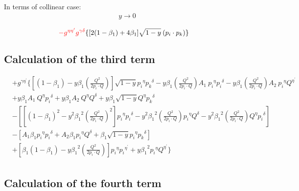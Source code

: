 In terms of collinear case:
\begin{equation}
\begin{split}
y\rightarrow 0
\end{split}
\end{equation}

\begin{equation}
\begin{split}
&{\color[RGB]{255,0,0} -g^{{{\eta}}{{\eta}^{\prime}}}g^{{{\gamma}}{{\delta}}}}\lbrace [2(1-\beta_1)+4\beta_1] \sqrt{1-y}\:({p_i}\cdot{p_k})\rbrace
\end{split}
\end{equation}


\subsection*{Calculation of the third term}
\begin{equation}
\begin{split} 
&+g^{{{\gamma}}{{\eta}^{\prime}}}\lbrace [(1-\beta_1)-y\beta_1 (\frac{Q^2}{2p_i \cdot Q})] \sqrt{1-y}{p_i}^{{\eta}}{{p_k}^{{\delta}}}-y {\beta_1} (\frac{Q^2}{2p_i \cdot Q}) A_1 \:{p_i}^{{\eta}}{p_i}^{{\delta}}
-y {\beta_1} (\frac{Q^2}{2p_i \cdot Q}) A_2\: {p_i}^{{\eta}}{Q}^{{\eta}^{\prime}}\\
&+y {\beta_1} A_1 \:{Q}^{{\eta}}{p_i}^{{\delta}}+y {\beta_1} A_2 \:{Q}^{{\eta}}{Q}^{{\delta}}+y {\beta_1}\sqrt{1-y}{Q}^{{\eta}}{{p_k}^{{\delta}}}\\
&-[[(1-\beta_1)^2-y^2 {\beta_1}^2 (\frac{Q^2}{2p_i \cdot Q})^2] {p_i}^{{\eta}}{p_i}^{{\delta}}-y^2 {\beta_1}^2 (\frac{Q^2}{2p_i \cdot Q}){p_i}^{{\eta}}{Q}^{{\delta}}-y^2 {\beta_1}^2 (\frac{Q^2}{2p_i \cdot Q}){Q}^{{\eta}}{p_i}^{{\delta}}]\\
&-[A_1\beta_1 {p_i}^{{\eta}}{{p_i}^{{\delta}}}+A_2\beta_1 {p_i}^{{\eta}}{{Q}^{{\delta}}}+\beta_1 \sqrt{1-y}{p_i}^{{\eta}}{{p_k}^{{\delta}}}]\\
&+[\beta_1(1-\beta_1)-y {\beta_1}^2 (\frac{Q^2}{2p_i \cdot Q})] {p_i}^{{\eta}}{p_i}^{{\eta}^{\prime}}+y {\beta_1}^2 {p_i}^{{\eta}}{Q}^{{\eta}^{\prime}}\rbrace\\
\end{split}
\end{equation}

\subsection*{Calculation of the fourth term}

